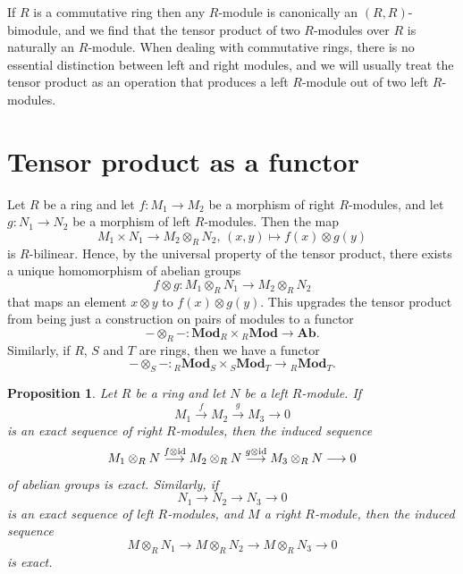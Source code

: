 \documentclass[11pt]{amsbook}
\newcommand{\longto}{\longrightarrow}
\DeclareMathOperator\Mod{{\bf{Mod}}}
\def\id{{\rm id}}
\def\Ab{\mathbf{Ab}}
\def\Mod{\mathbf{Mod}}
\theoremstyle{plain}
\newtheorem{proposition}[theorem]{Proposition}
\theoremstyle{definition}
\begin{document}
If $R$ is a commutative ring then any $R$-module is canonically an $(R,R)$-bimodule, and we find that
the tensor product of two $R$-modules over $R$ is naturally an $R$-module. When dealing with commutative rings, there is no essential distinction between left and right modules, and we will usually treat the tensor product as an operation that produces a left $R$-module out of two left $R$-modules.





\section{Tensor product as a functor}

Let $R$ be a ring and let $f\colon M_1\to M_2$ be a morphism of right $R$-modules, and let $g\colon N_1\to N_2$ be a morphism of left $R$-modules. Then the map
\[
	M_1\times N_1 \to M_2\otimes_R N_2,\, (x,y) \mapsto f(x)\otimes g(y)
\]
is $R$-bilinear. Hence, by the universal property of the tensor product, there exists a unique homomorphism of abelian groups
\[
	f\otimes g\colon M_1\otimes_R N_1 \to M_2\otimes_R N_2
\]
that maps an element $x\otimes y$ to $f(x)\otimes g(y)$. This upgrades  the tensor product from being just a construction on pairs of modules to a functor
\[
	-\otimes_R-\colon \Mod_R \times {}_R\Mod \to \Ab.
\]
Similarly, if $R$, $S$ and $T$ are rings, then we have a functor
\[
	-\otimes_S- \colon {}_R\Mod_S \times {}_S\Mod_T \to {}_R\Mod_T.
\]
	
\begin{proposition}\label{prop:tensor-right-exact}
Let $R$ be a ring and let $N$ be a left $R$-module. If 
\begin{equation}\label{eq:pre-tensor-right-exact}
	M_1 \overset{f}{\longto} M_2 \overset{g}{\longto} M_3 \longto 0
\end{equation}
is an exact sequence of right $R$-modules, then the induced sequence
\begin{equation}\label{eq:tensor-right-exact}
	M_1\otimes_R N \overset{f\otimes \id}{\longto}
	M_2\otimes_R N \overset{g\otimes \id}{\longto}
	M_3\otimes_R N \longto 0
\end{equation}
of abelian groups is exact. Similarly, if
\[
	N_1 \longto N_2 \longto N_3 \longto 0
\]
is an exact sequence of left $R$-modules, and $M$ a right $R$-module, then the induced sequence
\[
	M \otimes_R N_1 \longto M \otimes_R N_2 \longto M \otimes_R N_3 \longto 0
\]
is exact.
\end{proposition}
\end{document}
